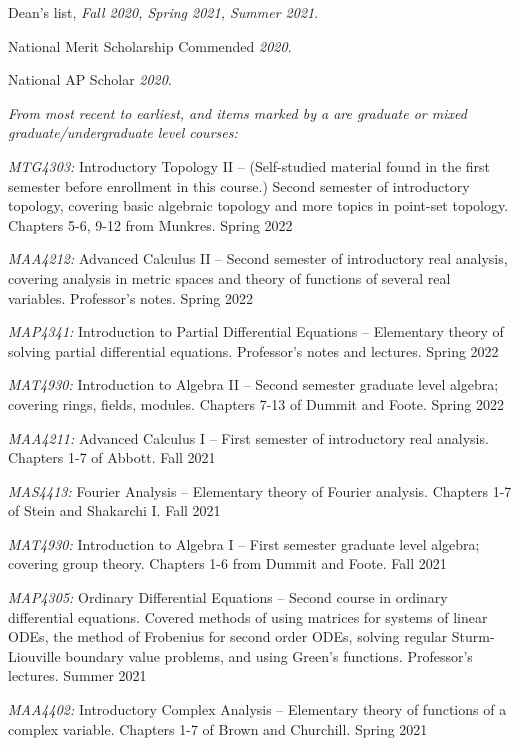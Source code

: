 \documentclass[11pt]{article}
\begin{document}
Dean's list, \textsl{Fall 2020, Spring 2021, Summer 2021}.

National Merit Scholarship Commended \textsl{2020}.

National AP Scholar \textsl{2020}.

\noindent{}

\textsl{From most recent to earliest, and items marked by a \textsuperscript{\textdagger} are graduate or mixed graduate/undergraduate level courses:}

\textsl{MTG4303\textsuperscript{\textdagger}:} Introductory Topology II -- (Self-studied material found in the first semester before enrollment in this course.) Second semester of introductory topology, covering basic algebraic topology and more topics in point-set topology. Chapters 5-6, 9-12 from Munkres. Spring 2022

\textsl{MAA4212:} Advanced Calculus II -- Second semester of introductory real analysis, covering analysis in metric spaces and theory of functions of several real variables. Professor's notes. Spring 2022

\textsl{MAP4341\textsuperscript{\textdagger}:} Introduction to Partial Differential Equations -- Elementary theory of solving partial differential equations. Professor's notes and lectures. Spring 2022

\textsl{MAT4930\textsuperscript{\textdagger}:} Introduction to Algebra II -- Second semester graduate level algebra; covering rings, fields, modules. Chapters 7-13 of Dummit and Foote. Spring 2022

\textsl{MAA4211:} Advanced Calculus I -- First semester of introductory real analysis. Chapters 1-7 of Abbott. Fall 2021

\textsl{MAS4413:} Fourier Analysis -- Elementary theory of Fourier analysis. Chapters 1-7 of Stein and Shakarchi I. Fall 2021

\textsl{MAT4930\textsuperscript{\textdagger}:} Introduction to Algebra I -- First semester graduate level algebra; covering group theory. Chapters 1-6 from Dummit and Foote. Fall 2021

\textsl{MAP4305:} Ordinary Differential Equations -- Second course in ordinary differential equations. Covered methods of using matrices for systems of linear ODEs, the method of Frobenius for second order ODEs, solving regular Sturm-Liouville boundary value problems, and using Green's functions. Professor's lectures. Summer 2021

\textsl{MAA4402:} Introductory Complex Analysis -- Elementary theory of functions of a complex variable. Chapters 1-7 of Brown and Churchill. Spring 2021
\end{document}
